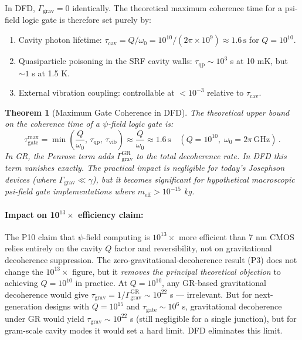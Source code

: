 \documentclass[11pt]{article}
\newtheorem{theorem}{Theorem}[section]
\theoremstyle{definition}
\theoremstyle{remark}
\begin{document}
In DFD, $\Gamma_{\mathrm{grav}} = 0$ identically. The theoretical maximum
coherence time for a psi-field logic gate is therefore set purely by:
\begin{enumerate}
\item Cavity photon lifetime: $\tau_{\mathrm{cav}} = Q/\omega_0 = 10^{10}/
(2\pi \times 10^9) \approx 1.6\,\mathrm{s}$ for $Q = 10^{10}$.
\item Quasiparticle poisoning in the SRF cavity walls: $\tau_{\mathrm{qp}}
\sim 10^3$ s at 10 mK, but $\sim 1$ s at 1.5 K.
\item External vibration coupling: controllable at $< 10^{-3}$ relative to
$\tau_{\mathrm{cav}}$.
\end{enumerate}

\begin{theorem}[Maximum Gate Coherence in DFD]
The theoretical upper bound on the coherence time of a $\psi$-field logic gate
is:
\begin{equation}
\boxed{
\tau_{\mathrm{gate}}^{\max} = \min\!\left(\frac{Q}{\omega_0},\,
\tau_{\mathrm{qp}},\, \tau_{\mathrm{vib}}\right) \approx \frac{Q}{\omega_0}
\approx 1.6\,\mathrm{s} \quad (Q = 10^{10},\;\omega_0 = 2\pi\,\mathrm{GHz})\,.
}
\label{eq:max-gate-coherence}
\end{equation}
In GR, the Penrose term adds $\Gamma_{\mathrm{grav}}^{\mathrm{GR}}$ to the
total decoherence rate. In DFD this term vanishes exactly. The practical impact
is negligible for today's Josephson devices (where $\Gamma_{\mathrm{grav}}
\ll \gamma$), but it becomes significant for hypothetical macroscopic psi-field
gate implementations where $m_{\mathrm{eff}} > 10^{-15}$ kg.
\end{theorem}

\paragraph{Impact on 10$^{13}\times$ efficiency claim:}
The P10 claim that $\psi$-field computing is $10^{13}\times$ more efficient
than 7 nm CMOS relies entirely on the cavity $Q$ factor and reversibility,
not on gravitational decoherence suppression. The zero-gravitational-decoherence
result (P3) does not change the $10^{13}\times$ figure, but it \emph{removes
the principal theoretical objection} to achieving $Q = 10^{10}$ in practice.
At $Q = 10^{10}$, any GR-based gravitational decoherence would give
$\tau_{\mathrm{grav}} = 1/\Gamma_{\mathrm{grav}}^{\mathrm{GR}} \sim 10^{22}$ s
--- irrelevant. But for next-generation designs with $Q = 10^{15}$ and
$\tau_{\mathrm{gate}} \sim 10^6$ s, gravitational decoherence under GR would
yield $\tau_{\mathrm{grav}} \sim 10^{22}$ s (still negligible for a
single junction), but for gram-scale cavity modes it would set a hard limit.
DFD eliminates this limit.
\end{document}
